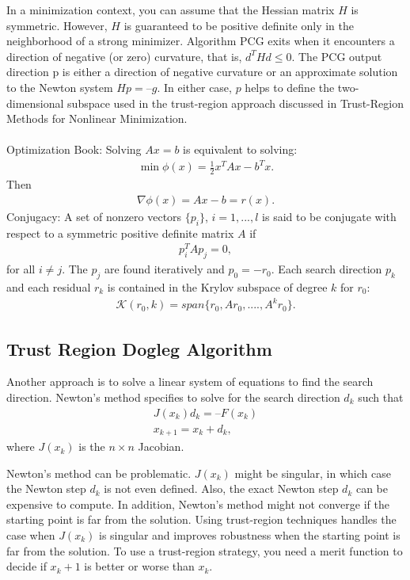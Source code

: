 \documentclass[11pt, a4paper]{article}
\theoremstyle{definition}
\begin{document}
In a minimization context, you can assume that the Hessian matrix $H$ is symmetric. However, $H$ is guaranteed to be positive definite only in the neighborhood of a strong minimizer. Algorithm PCG exits when it encounters a direction of negative (or zero) curvature, that is, $d^THd \leq 0$. The PCG output direction p is either a direction of negative curvature or an approximate solution to the Newton system $Hp = –g$. In either case, $p$ helps to define the two-dimensional subspace used in the trust-region approach discussed in Trust-Region Methods for Nonlinear Minimization.
\\
\\
Optimization Book:
Solving $Ax=b$ is equivalent to solving:
\begin{align*}
\min \phi(x)= \frac{1}{2} x^TAx -b^Tx.
\end{align*}
Then
\begin{align*}
\nabla \phi(x) = Ax-b =r(x).
\end{align*}
Conjugacy: A set of nonzero vectors $\{p_i\}$, $i=1,...,l$ is said to be conjugate with respect to a symmetric positive definite matrix $A$ if
\begin{align*}
p^T_i Ap_j =0,
\end{align*}
for all $i \neq j$.
The $p_j$ are found iteratively and $p_0 = -r_0$.
Each search direction $p_k$ and each residual $r_k$ is contained in the Krylov subspace of degree $k$ for $r_0$:
\begin{align*}
\mathcal{K}(r_0,k)= span\{r_0, Ar_0,....,A^kr_0\}.
\end{align*}
\subsection{Trust Region Dogleg Algorithm}

Another approach is to solve a linear system of equations to find the search direction. Newton's method specifies to solve for the search direction $d_k$ such that
\begin{align*}
J(x_k)d_k = –F(x_k)\\
x_{k + 1} = x_k + d_k,
\end{align*}
where $J(x_k)$ is the $n \times n$ Jacobian.

Newton's method can be problematic. $J(x_k)$ might be singular, in which case the Newton step $d_k$ is not even defined. Also, the exact Newton step $d_k$ can be expensive to compute. In addition, Newton's method might not converge if the starting point is far from the solution.
Using trust-region techniques handles the case when $J(x_k)$ is singular and improves robustness when the starting point is far from the solution. To use a trust-region strategy, you need a merit function to decide if $x_k + 1$ is better or worse than $x_k$.
\end{document}
